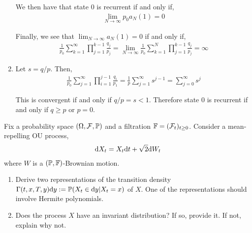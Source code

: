 \begin{solution}[Solution]
\begin{enumerate}[label=(\alph*)]
        We then have that state 0 is recurrent if and only if,
        \begin{align*}
            \lim_{N\to\infty} p_0a_N(1) = 0 
        \end{align*}
        
\iffalse
        Therefore state 0 is recurrent if and only if,
        \begin{align*}
            p_0 = 0 \text{ or } \lim_{N\to\infty} a_N(1) = 0
        \end{align*}
\fi
        Finally, we see that \( \lim_{N\to\infty} a_N(1) = 0 \) if and only if,
        \begin{align*}
            \frac{1}{p_0}\sum_{k=1}^\infty \prod_{j=1}^{k-1}\frac{q_j}{p_j}
            = \lim_{N\to\infty}\frac{1}{p_0}\sum_{k=1}^N \prod_{j=1}^{k-1}\frac{q_j}{p_j}
            = \infty
        \end{align*}

    
    \item
        Let \( s = q/p \). Then,
        \begin{align*}
            \frac{1}{p_0}\sum_{j=1}^{\infty} \prod_{i=1}^{j-1} \frac{q_i}{p_1} = \frac{1}{p} \sum_{j=1}^{\infty} s^{j-1} = \sum_{j=0}^{\infty} s^j
        \end{align*}
        
        This is convergent if and only if \( q/p = s < 1 \). Therefore state 0 is recurrent if and only if \( q \geq p \) or \( p=0 \).


\end{enumerate}
\end{solution}


\begin{problem}
    Fix a probability space \( (\Omega,\mathcal{F},\mathbb{P}) \) and a filtration \( \mathbb{F} = (\mathcal{F}_t)_{t\geq 0} \). Consider a mean-repelling OU process,
    \begin{align*}
        \mathrm{d} X_t = X_t\mathrm{d} t + \sqrt{2} \mathrm{d} W_t
    \end{align*}
    where \( W \) is a \( (\mathbb{P},\mathbb{F}) \)-Brownian motion.
\begin{enumerate}[nolistsep,label=(\alph*)]
    \item Derive two representations of the transition density \( \Gamma(t,x,T,y)\mathrm{d} y := \mathbb{P}(X_t \in\mathrm{d} y | X_t = x) \) of \( X \). One of the representations should involve Hermite polynomials.
    \item Does the process \( X \) have an invariant distribution? If so, provide it. If not, explain why not.
\end{enumerate}
\end{problem}

